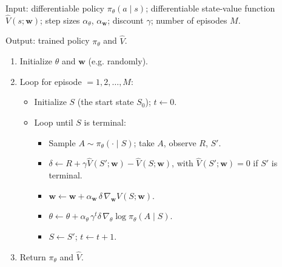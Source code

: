 \begin{implnote}
Input: differentiable policy $\pi_\theta(a\mid s)$; differentiable state-value function $\hat{V}(s;\mathbf{w})$; step sizes $\alpha_\theta$, $\alpha_{\mathbf{w}}$; discount $\gamma$; number of episodes $M$.

Output: trained policy $\pi_\theta$ and $\hat{V}$.

\begin{enumerate}
\item Initialize $\theta$ and $\mathbf{w}$ (e.g. randomly).
\item Loop for episode $=1,2,\ldots,M$:
\begin{itemize}
\item Initialize $S$ (the start state $S_0$); $t\leftarrow 0$.
\item Loop until $S$ is terminal:
\begin{itemize}
\item Sample $A\sim\pi_\theta(\cdot\mid S)$; take $A$, observe $R$, $S'$.
\item $\delta\leftarrow R+\gamma\hat{V}(S';\mathbf{w})-\hat{V}(S;\mathbf{w})$, with $\hat{V}(S';\mathbf{w})=0$ if $S'$ is terminal.
\item $\mathbf{w}\leftarrow\mathbf{w}+\alpha_{\mathbf{w}}\,\delta\,\nabla_{\mathbf{w}}\hat{V}(S;\mathbf{w})$.
\item $\theta\leftarrow\theta+\alpha_\theta\,\gamma^{t}\delta\,\nabla_\theta\log\pi_\theta(A\mid S)$.
\item $S\leftarrow S'$; $t\leftarrow t+1$.
\end{itemize}
\end{itemize}
\item Return $\pi_\theta$ and $\hat{V}$.
\end{enumerate}

\end{implnote}



